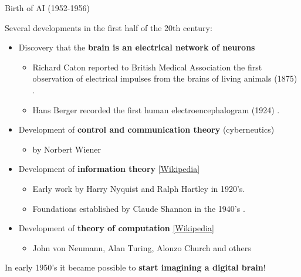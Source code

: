 %
%
%

\begin{frame}[t]{Birth of AI (1952-1956)} 

    Several developments in the first half of the 20th century:
    \begin{itemize}
        \item Discovery that the {\bf brain is an electrical network of neurons}
        \begin{itemize}
            \item 
              Richard Caton reported to British Medical Association 
              the first observation of electrical impulses from the 
              brains of living animals (1875) \cite{Caton:1875}.
            \item 
              Hans Berger recorded the first human 
              electroencephalogram (1924) \cite{Berger:1929}.
        \end{itemize}
        \item 
        Development of {\bf control and communication theory} (cyberneutics) 
        \begin{itemize}
            \item by Norbert Wiener
        \end{itemize}
        \item 
        Development of {\bf information theory} 
        \href{https://en.wikipedia.org/wiki/Information_theory}{\tiny [Wikipedia]}
        \begin{itemize}
            \item Early work by Harry Nyquist and Ralph Hartley in 1920's.
            \item Foundations established by Claude Shannon in the 1940's \cite{Shannon:1948}.
        \end{itemize}
        \item 
        Development of {\bf theory of computation} 
        \href{https://en.wikipedia.org/wiki/Theory_of_computation}{\tiny [Wikipedia]}
        \begin{itemize}
            \item John von Neumann, Alan Turing, Alonzo Church and others
        \end{itemize}
    \end{itemize}
    \vspace{0.2cm}
    In early 1950's it became possible to {\bf start imagining a digital brain}!
            
\end{frame}
    
    
    